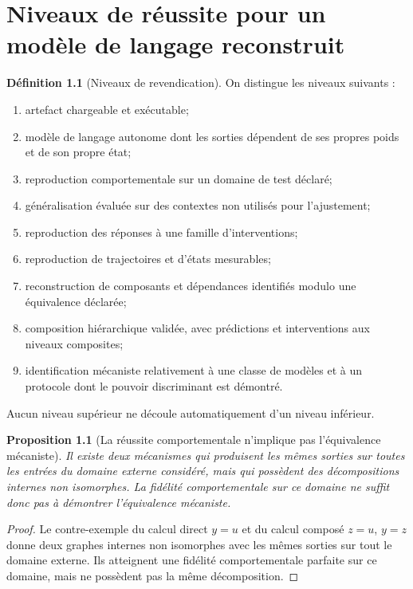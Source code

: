 \documentclass[11pt,oneside]{book}
\newtheorem{proposition}[theoreme]{Proposition}
\theoremstyle{definition}
\newtheorem{definition}[theoreme]{Définition}
\theoremstyle{remark}
\newcommand{\1}{\mathbf 1}
\begin{document}
\chapter{Niveaux de réussite pour un modèle de langage reconstruit}
\begin{definition}[Niveaux de revendication]
On distingue les niveaux suivants :
\begin{enumerate}[label=\textbf{N\arabic*.}]
\item artefact chargeable et exécutable;
\item modèle de langage autonome dont les sorties dépendent de ses propres poids et de son propre état;
\item reproduction comportementale sur un domaine de test déclaré;
\item généralisation évaluée sur des contextes non utilisés pour l'ajustement;
\item reproduction des réponses à une famille d'interventions;
\item reproduction de trajectoires et d'états mesurables;
\item reconstruction de composants et dépendances identifiés modulo une équivalence déclarée;
\item composition hiérarchique validée, avec prédictions et interventions aux niveaux composites;
\item identification mécaniste relativement à une classe de modèles et à un protocole dont le pouvoir discriminant est démontré.
\end{enumerate}
Aucun niveau supérieur ne découle automatiquement d'un niveau inférieur.
\end{definition}

\begin{proposition}[La réussite comportementale n'implique pas l'équivalence mécaniste]
Il existe deux mécanismes qui produisent les mêmes sorties sur toutes les entrées du domaine externe considéré, mais qui possèdent des décompositions internes non isomorphes. La fidélité comportementale sur ce domaine ne suffit donc pas à démontrer l'équivalence mécaniste.
\end{proposition}
\begin{proof}
Le contre-exemple du calcul direct $y=u$ et du calcul composé $z=u$, $y=z$ donne deux graphes internes non isomorphes avec les mêmes sorties sur tout le domaine externe. Ils atteignent une fidélité comportementale parfaite sur ce domaine, mais ne possèdent pas la même décomposition.\end{proof}
\end{document}
